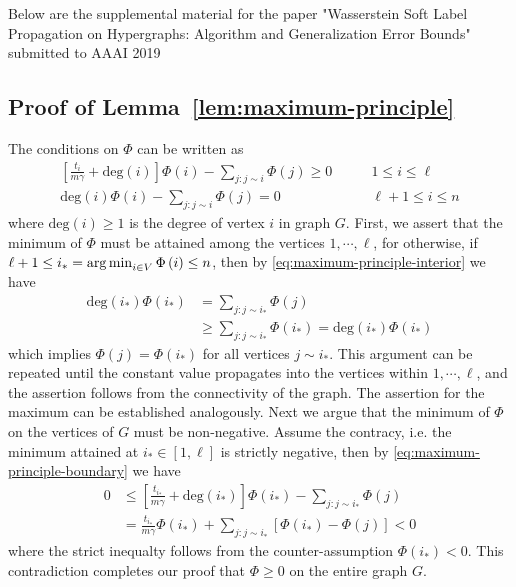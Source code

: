 \documentclass[letterpaper]{article} %
\begin{document}
	

		Below are the supplemental material for the paper  "Wasserstein Soft Label Propagation on Hypergraphs: Algorithm and Generalization Error Bounds"   submitted to AAAI 2019 

	
	\subsection{Proof of Lemma~\ref{lem:maximum-principle}}
	The conditions on $\Phi$ can be written as
	\begin{align}
	\left[\frac{t_i}{m\gamma}+\mathrm{deg}\left(i\right)\right]\Phi \left( i \right)-\sum_{j:j\sim i}\Phi \left( j \right)\geq 0 & \qquad 1\leq i\leq \ell\label{eq:maximum-principle-boundary}\\
	\mathrm{deg}\left(i\right)\Phi \left( i \right)-\sum_{j:j\sim i}\Phi \left( j \right)=0 & \qquad \ell+1\leq i\leq n\label{eq:maximum-principle-interior}
	\end{align}
	where $\mathrm{deg}\left( i \right)\geq 1$ is the degree of vertex $i$ in graph $G$. First, we assert that the minimum of $\Phi$ must be attained among the vertices $1,\cdots,\ell$, for otherwise, if $\ell+1\leq i_*=\mathop{\rm arg\, min}_{i\in V}\Phi \left( i \right)\leq n$, then by \eqref{eq:maximum-principle-interior} we have
	\begin{equation*}
	\begin{aligned}
	\mathrm{deg}\left(i_*\right)\Phi \left( i_* \right)&=\sum_{j:j\sim i_*}\Phi \left( j \right)\\
	&\geq \sum_{j:j\sim i_*}\Phi \left( i_* \right)=\mathrm{deg}\left(i_*\right)\Phi \left( i_* \right)
	\end{aligned}
	\end{equation*}
	which implies $\Phi \left( j \right)=\Phi \left( i_* \right)$ for all vertices $j\sim i_*$. This argument can be repeated until the constant value propagates into the vertices within $1,\cdots,\ell$, and the assertion follows from the connectivity of the graph. The assertion for the maximum can be established analogously. Next we argue that the minimum of $\Phi$ on the vertices of $G$ must be non-negative. Assume the contracy, i.e. the minimum attained at $i_*\in \left[ 1,\ell \right]$ is strictly negative, then by \eqref{eq:maximum-principle-boundary} we have
	\begin{equation*}
	\begin{aligned}
	0 &\leq \left[\frac{t_{i_*}}{m\gamma}+\mathrm{deg}\left(i_{*}\right)\right]\Phi \left( i_{*} \right)-\sum_{j:j\sim i_{*}}\Phi \left( j \right)\\
	&=\frac{t_{i_*}}{m\gamma}\Phi \left( i_* \right)+\sum_{j:j\sim i_*}\left[ \Phi \left( i_* \right)-\Phi \left( j \right) \right]<0
	\end{aligned}
	\end{equation*}
	where the strict inequalty follows from the counter-assumption $\Phi \left( i_{*} \right)<0$. This contradiction completes our proof that $\Phi \geq 0$ on the entire graph $G$.
	
\end{document}
